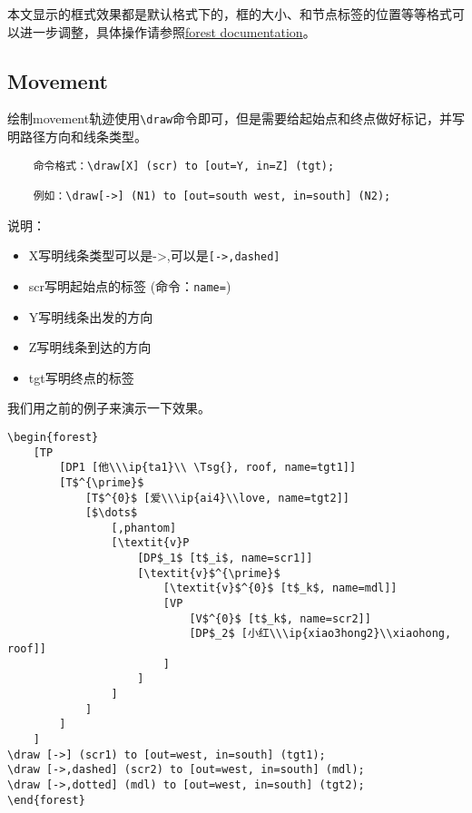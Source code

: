 \documentclass[a4paper,12pt]{article}
\begin{document}
本文显示的框式效果都是默认格式下的，框的大小、和节点标签的位置等等格式可以进一步调整，具体操作请参照\href{https://mirror.koddos.net/CTAN/graphics/pgf/contrib/forest/forest-doc.pdf}{forest documentation}。

\subsection{Movement}

绘制movement轨迹使用\verb|\draw|命令即可，但是需要给起始点和终点做好标记，并写明路径方向和线条类型。

\begin{verbatim}
	命令格式：\draw[X] (scr) to [out=Y, in=Z] (tgt);
	
	例如：\draw[->] (N1) to [out=south west, in=south] (N2);
\end{verbatim}

说明：
	\begin{itemize}
		\item X写明线条类型可以是->,可以是\verb|[->,dashed]|
		\item scr写明起始点的标签 (命令：\verb|name=|)
		\item Y写明线条出发的方向
		\item Z写明线条到达的方向
		\item tgt写明终点的标签
	\end{itemize}

\vspace{3mm}
\noindent 我们用之前的例子来演示一下效果。

\begin{Verbatim}
\begin{forest}
	[TP
		[DP1 [他\\\ip{ta1}\\ \Tsg{}, roof, name=tgt1]]
		[T$^{\prime}$
			[T$^{0}$ [爱\\\ip{ai4}\\love, name=tgt2]]
			[$\dots$
				[,phantom]
				[\textit{v}P
					[DP$_1$ [t$_i$, name=scr1]]
					[\textit{v}$^{\prime}$
						[\textit{v}$^{0}$ [t$_k$, name=mdl]]
						[VP
							[V$^{0}$ [t$_k$, name=scr2]]
							[DP$_2$ [小红\\\ip{xiao3hong2}\\xiaohong, roof]]
						]	
					]	
				]
			]
		]
	]
\draw [->] (scr1) to [out=west, in=south] (tgt1);
\draw [->,dashed] (scr2) to [out=west, in=south] (mdl);
\draw [->,dotted] (mdl) to [out=west, in=south] (tgt2);	
\end{forest}
\end{Verbatim}
\end{document}
